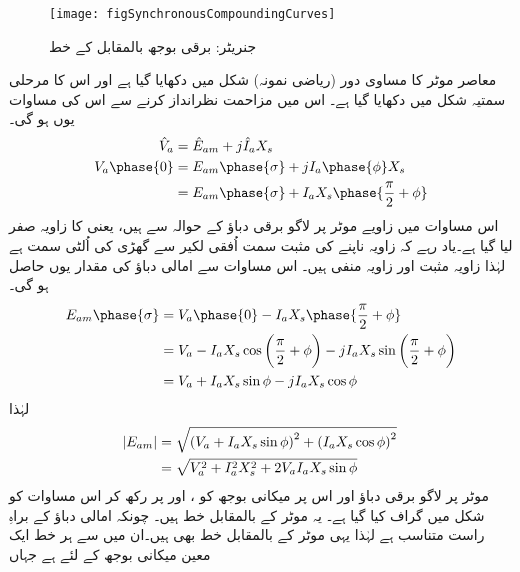 \begin{figure}
\centering
\texttt{[image: figSynchronousCompoundingCurves]}
\caption{جنریٹر: برقی بوجھ بالمقابل  کے خط}
\label{شکل_معاصر_بار_بالمقابل_میدانی_رو}
\end{figure}
معاصر موٹر کا مساوی دور (ریاضی نمونہ) شکل   میں دکھایا گیا ہے اور اس کا مرحلی سمتیہ شکل   میں دکھایا گیا ہے۔ اس میں مزاحمت نظرانداز کرنے سے اس کی مساوات یوں ہو گی۔
\begin{gather}
\begin{aligned}
\hat{V}_a&=\hat{E}_{am}+j \hat{I}_a X_s\\
V_a \phase{0}&=E_{am} \phase{\sigma} +j I_a \phase{\phi} X_s\\
&=E_{am} \phase{\sigma} +I_a X_s \phase{\frac{\pi}{2}+\phi}
\end{aligned}
\end{gather}
اس مساوات میں زاویے موٹر پر لاگو برقی دباؤ  کے حوالہ سے ہیں، یعنی   کا زاویہ صفر لیا گیا ہے۔یاد رہے کہ زاویہ ناپنے کی مثبت سمت اُفقی لکیر سے گھڑی کی اُلٹی سمت ہے لہٰذا  زاویہ مثبت اور  زاویہ منفی ہیں۔ اس مساوات سے امالی دباؤ  کی مقدار یوں حاصل ہو گی۔
\begin{align*}
E_{am}\phase{\sigma}&=V_a \phase{0}-I_a X_s \phase{\frac{\pi}{2}+\phi}\\
&=V_a -I_a X_s  \cos \left( \frac{\pi}{2}+\phi\right)- j I_a X_s \sin \left(\frac{\pi}{2}+\phi \right)\\
&=V_a +I_a X_s \sin \phi-j I_a X_s \cos \phi
\end{align*}
لہٰذا
\begin{gather}
\begin{aligned}\label{مسوات_معاصر_دوری_مساوات}
\abs{E_{am}}&=\sqrt{\left(V_a +I_a X_s \sin \phi \right)^2+\left(I_a X_s \cos \phi \right)^2}\\
&=\sqrt{V_a^2+I_a^2 X_s^2+ 2 V_a I_a X_s \sin \phi}
\end{aligned}
\end{gather}
موٹر پر لاگو برقی دباؤ اور اس پر میکانی بوجھ کو ،  اور  پر رکھ کر اس مساوات کو شکل    میں  گراف کیا گیا ہے۔ یہ موٹر کے  بالمقابل   خط ہیں۔ چونکہ امالی دباؤ  کے براہِ راست متناسب ہے لہٰذا یہی موٹر کے  بالمقابل  خط بھی ہیں۔ان میں سے ہر خط ایک معین میکانی بوجھ  کے لئے ہے جہاں
